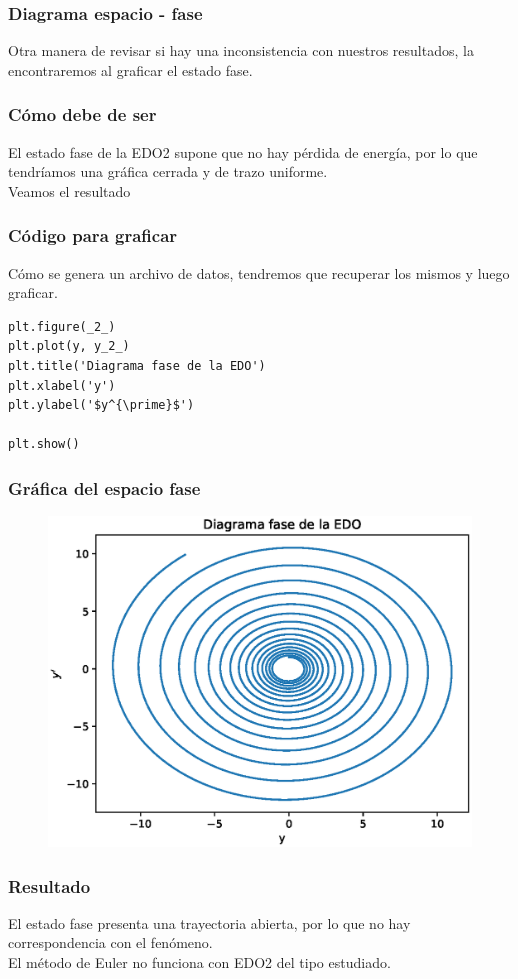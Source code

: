 \begin{frame}
\frametitle{Diagrama espacio - fase}
Otra manera de revisar si hay una inconsistencia con nuestros resultados, la encontraremos al graficar el estado fase.
\end{frame}
\begin{frame}
\frametitle{Cómo debe de ser}
El estado fase de la EDO2 supone que no hay pérdida de energía, por lo que tendríamos una gráfica cerrada y de trazo uniforme.
\\
\bigskip
Veamos el resultado
\end{frame}
\begin{frame}
\frametitle{Código para graficar}
Cómo se genera un archivo de datos, tendremos que recuperar los mismos y luego graficar.
\begin{lstlisting}[caption=Código para graficar, style=FormattedNumber, basicstyle=\linespread{1.1}\ttfamily=\small, columns=fullflexible]
plt.figure(_2_)
plt.plot(y, y_2_)
plt.title('Diagrama fase de la EDO')
plt.xlabel('y')
plt.ylabel('$y^{\prime}$')

plt.show()
\end{lstlisting}
\end{frame}
\begin{frame}[plain]
\frametitle{Gráfica del espacio fase}
\begin{figure}
	\centering
	\includegraphics[scale=0.65]{Imagenes/solucion_euler_02.eps}
\end{figure}
\end{frame}
\begin{frame}
\frametitle{Resultado}
El estado fase presenta una trayectoria abierta, por lo que no hay correspondencia con el fenómeno.
\\
\bigskip
El método de Euler no funciona con EDO2 del tipo estudiado.
\end{frame}
